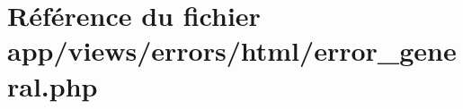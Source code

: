 \hypertarget{html_2error__general_8php}{}\section{Référence du fichier app/views/errors/html/error\+\_\+general.php}
\label{html_2error__general_8php}
